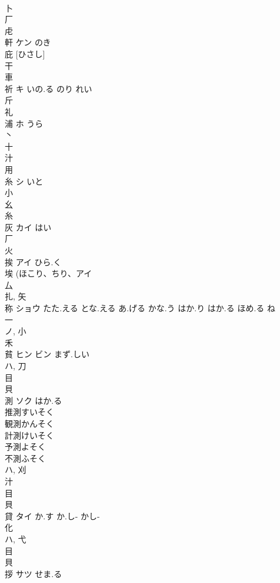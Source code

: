 \documentclass[8pt]{extreport}
\begin{document}
\begin{CJK}{UTF8}{min}
\\	卜 
\\	厂 
\\	虍 
\\	軒	ケン	のき	
\\	庇 [ひさし] 
\\	干 
\\	車 
\\	祈	キ	いの.る のり れい	
\\	斤 
\\	礼 
\\	浦	ホ	うら	
\\	丶 
\\	十 
\\	汁 
\\	用 
\\	糸	シ	いと	
\\	小 
\\	幺 
\\	糸 
\\	灰	カイ	はい	
\\	厂 
\\	火 
\\	挨	アイ	ひら.く	
\\	埃 (ほこり、ちり、アイ 
\\	厶 
\\	扎, 矢 
\\	称	ショウ	たた.える とな.える あ.げる かな.う はか.り はか.る ほめ.る ね	
\\	一 
\\	ノ, 小 
\\	禾 
\\	貧	ヒン ビン	まず.しい	
\\	ハ, 刀 
\\	目 
\\	貝 
\\	測	ソク	はか.る	
\\	推測すいそく
\\	観測かんそく
\\	計測けいそく
\\	予測よそく
\\	不測ふそく
\\	ハ, 刈 
\\	汁 
\\	目 
\\	貝 
\\	貸	タイ	か.す か.し- かし-	
\\	化 
\\	ハ, 弋 
\\	目 
\\	貝 
\\	拶	サツ	せま.る	

\end{CJK}
\end{document}
